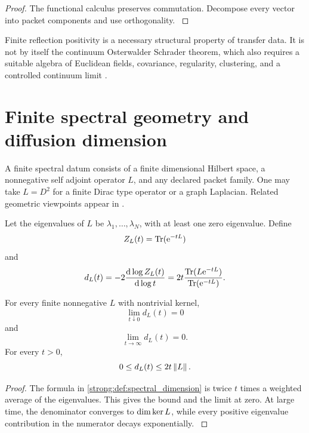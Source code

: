 \begin{proof}\label{strong:proof:061}
The functional calculus preserves commutation. Decompose every vector into packet components and use orthogonality.
\label{strong:proof:061:end}\end{proof}

Finite reflection positivity is a necessary structural property of transfer data. It is not by itself the continuum Osterwalder Schrader theorem, which also requires a suitable algebra of Euclidean fields, covariance, regularity, clustering, and a controlled continuum limit \cite{OsterwalderSchrader1973,OsterwalderSchrader1975,GlimmJaffe1987}.

\section{Finite spectral geometry and diffusion dimension}\label{strong:section:011}\label{strong:sec:spectral_geometry}

A finite spectral datum consists of a finite dimensional Hilbert space, a nonnegative self adjoint operator \(L\), and any declared packet family. One may take \(L=D^2\) for a finite Dirac type operator or a graph Laplacian. Related geometric viewpoints appear in \cite{Connes1994,Vassilevich2003}.

\begin{definition}\label{strong:definition:008}\label{strong:def:spectral_dimension}
Let the eigenvalues of \(L\) be \(\lambda_1,\ldots,\lambda_N\), with at least one zero eigenvalue. Define
\[
Z_L(t)=\Tr(\e^{-tL})
\]
and
\[
d_L(t)
=-2\frac{\dd\log Z_L(t)}{\dd\log t}
=
2t
\frac{\Tr(L\e^{-tL})}{\Tr(\e^{-tL})}.
\]
\end{definition}

\begin{proposition}\label{strong:proposition:009}\label{strong:prop:finite_spectral_limits}
For every finite nonnegative \(L\) with nontrivial kernel,
\[
\lim_{t\downarrow0}d_L(t)=0
\]
and
\[
\lim_{t\to\infty}d_L(t)=0.
\]
For every \(t>0\),
\[
0\leq d_L(t)\leq2t\left\lVert L\right\rVert.
\]
\end{proposition}

\begin{proof}\label{strong:proof:062}
The formula in \cref{strong:def:spectral_dimension} is twice \(t\) times a weighted average of the eigenvalues. This gives the bound and the limit at zero. At large time, the denominator converges to \(\dim\operatorname{ker} L\), while every positive eigenvalue contribution in the numerator decays exponentially.
\label{strong:proof:062:end}\end{proof}


